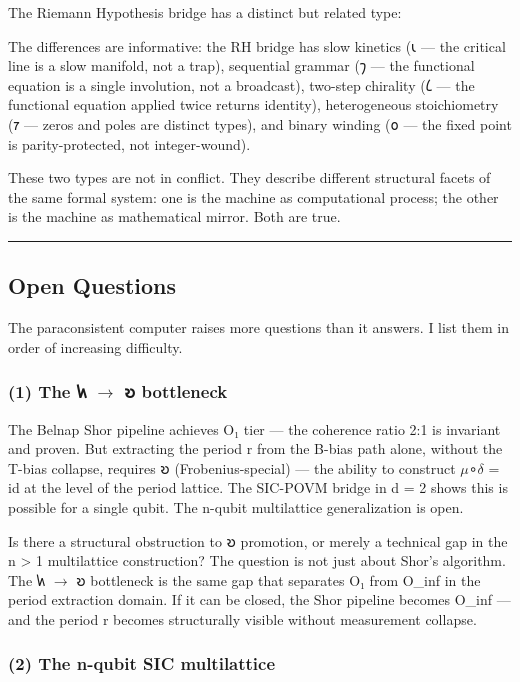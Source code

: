 \documentclass[12pt,a4paper]{article}
\begin{document}
The Riemann Hypothesis bridge has a distinct but related type:

The differences are informative: the RH bridge has slow kinetics (𐑧 --- the critical line is a slow manifold, not a trap), sequential grammar (𐑠 --- the functional equation is a single involution, not a broadcast), two-step chirality (𐑖 --- the functional equation applied twice returns identity), heterogeneous stoichiometry (𐑳 --- zeros and poles are distinct types), and binary winding (𐑴 --- the fixed point is parity-protected, not integer-wound).

These two types are not in conflict. They describe different structural facets of the same formal system: one is the machine as computational process; the other is the machine as mathematical mirror. Both are true.

\begin{center}
\rule{0.5\textwidth}{0.4pt}
\end{center}

\subsection{Open Questions}

The paraconsistent computer raises more questions than it answers. I list them in order of increasing difficulty.

\subsubsection{(1) The 𐑿 $\rightarrow$ 𐑹 bottleneck}

The Belnap Shor pipeline achieves O₁ tier --- the coherence ratio 2:1 is invariant and proven. But extracting the period r from the B-bias path alone, without the T-bias collapse, requires 𐑹 (Frobenius-special) --- the ability to construct $\mu$∘$\delta$ = id at the level of the period lattice. The SIC-POVM bridge in d = 2 shows this is possible for a single qubit. The n-qubit multilattice generalization is open.

Is there a structural obstruction to 𐑹 promotion, or merely a technical gap in the n \textgreater{} 1 multilattice construction? The question is not just about Shor's algorithm. The 𐑿 $\rightarrow$ 𐑹 bottleneck is the same gap that separates O₁ from O\_inf in the period extraction domain. If it can be closed, the Shor pipeline becomes O\_inf --- and the period r becomes structurally visible without measurement collapse.

\subsubsection{(2) The n-qubit SIC multilattice}
\end{document}

